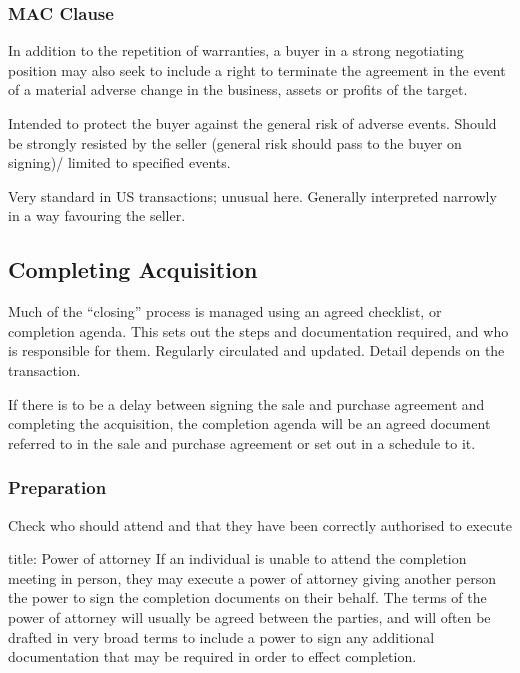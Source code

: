 \documentclass[
]{article}
\newenvironment{Shaded}{}{}
\newcommand{\NormalTok}[1]{#1}
\begin{document}
\hypertarget{mac-clause}{%
\subsubsection{MAC Clause}\label{mac-clause}}

In addition to the repetition of warranties, a buyer in a strong
negotiating position may also seek to include a right to terminate the
agreement in the event of a material adverse change in the business,
assets or profits of the target.

Intended to protect the buyer against the general risk of adverse
events. Should be strongly resisted by the seller (general risk should
pass to the buyer on signing)/ limited to specified events.

Very standard in US transactions; unusual here. Generally interpreted
narrowly in a way favouring the seller.

\hypertarget{completing-acquisition}{%
\subsection{Completing Acquisition}\label{completing-acquisition}}

Much of the ``closing'' process is managed using an agreed checklist, or
completion agenda. This sets out the steps and documentation required,
and who is responsible for them. Regularly circulated and updated.
Detail depends on the transaction.

If there is to be a delay between signing the sale and purchase
agreement and completing the acquisition, the completion agenda will be
an agreed document referred to in the sale and purchase agreement or set
out in a schedule to it.

\hypertarget{preparation}{%
\subsubsection{Preparation}\label{preparation}}

Check who should attend and that they have been correctly authorised to
execute

\begin{Shaded}
\begin{Highlighting}[]
\NormalTok{title: Power of attorney}
\NormalTok{If an individual is unable to attend the completion meeting in person, they may execute a power of attorney giving another person the power to sign the completion documents on their behalf. The terms of the power of attorney will usually be agreed between the parties, and will often be drafted in very broad terms to include a power to sign any additional documentation that may be required in order to effect completion.}
\end{Highlighting}
\end{Shaded}
\end{document}
